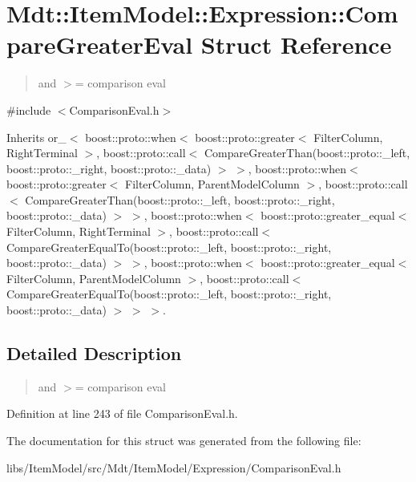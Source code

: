 \hypertarget{struct_mdt_1_1_item_model_1_1_expression_1_1_compare_greater_eval}{}\section{Mdt\+:\+:Item\+Model\+:\+:Expression\+:\+:Compare\+Greater\+Eval Struct Reference}
\label{struct_mdt_1_1_item_model_1_1_expression_1_1_compare_greater_eval}


\begin{quote}
and $>$= comparison eval \end{quote}
 




{\ttfamily \#include $<$Comparison\+Eval.\+h$>$}



Inherits or\+\_\+$<$ boost\+::proto\+::when$<$ boost\+::proto\+::greater$<$ Filter\+Column, Right\+Terminal $>$, boost\+::proto\+::call$<$ Compare\+Greater\+Than(boost\+::proto\+::\+\_\+left, boost\+::proto\+::\+\_\+right, boost\+::proto\+::\+\_\+data) $>$ $>$, boost\+::proto\+::when$<$ boost\+::proto\+::greater$<$ Filter\+Column, Parent\+Model\+Column $>$, boost\+::proto\+::call$<$ Compare\+Greater\+Than(boost\+::proto\+::\+\_\+left, boost\+::proto\+::\+\_\+right, boost\+::proto\+::\+\_\+data) $>$ $>$, boost\+::proto\+::when$<$ boost\+::proto\+::greater\+\_\+equal$<$ Filter\+Column, Right\+Terminal $>$, boost\+::proto\+::call$<$ Compare\+Greater\+Equal\+To(boost\+::proto\+::\+\_\+left, boost\+::proto\+::\+\_\+right, boost\+::proto\+::\+\_\+data) $>$ $>$, boost\+::proto\+::when$<$ boost\+::proto\+::greater\+\_\+equal$<$ Filter\+Column, Parent\+Model\+Column $>$, boost\+::proto\+::call$<$ Compare\+Greater\+Equal\+To(boost\+::proto\+::\+\_\+left, boost\+::proto\+::\+\_\+right, boost\+::proto\+::\+\_\+data) $>$ $>$ $>$.



\subsection{Detailed Description}
\begin{quote}
and $>$= comparison eval \end{quote}


Definition at line 243 of file Comparison\+Eval.\+h.



The documentation for this struct was generated from the following file\+:\begin{DoxyCompactItemize}
\item 
libs/\+Item\+Model/src/\+Mdt/\+Item\+Model/\+Expression/Comparison\+Eval.\+h\end{DoxyCompactItemize}
